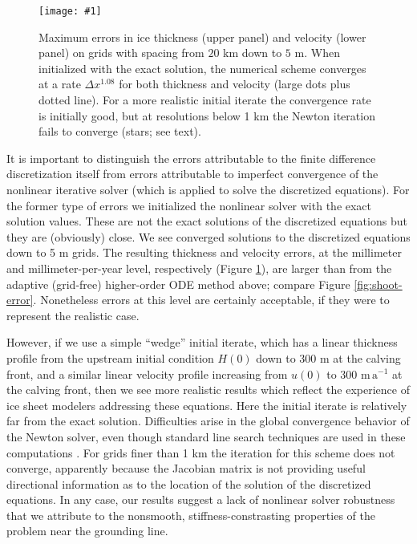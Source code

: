 \documentclass[review,letterpaper]{igs}
\newcommand{\onecol}[1]{\texttt{[image: \#1]}}
\begin{document}
\begin{figure}[ht]
\onecol{convmarine}
\caption{Maximum errors in ice thickness (upper panel) and velocity (lower panel) on grids with spacing from $20$ km down to $5$ m.  When initialized with the exact solution, the numerical scheme converges at a rate $\Delta x^{1.08}$ for both thickness and velocity (large dots plus dotted line).  For a more realistic initial iterate the convergence rate is initially good, but at resolutions below 1 km the Newton iteration fails to converge (stars; see text).} \label{fig:convmarine}
\end{figure}

It is important to distinguish the errors attributable to the finite difference discretization itself from errors attributable to imperfect convergence of the nonlinear iterative solver (which is applied to solve the discretized equations).  For the former type of errors we initialized the nonlinear solver with the exact solution values.  These are not the exact solutions of the discretized equations but they are (obviously) close.  We see converged solutions to the discretized equations down to 5 m grids.  The resulting thickness and velocity errors, at the millimeter and millimeter-per-year level, respectively (Figure \ref{fig:convmarine}), are larger than from the adaptive (grid-free) higher-order ODE method above; compare Figure \ref{fig:shoot-error}.  Nonetheless errors at this level are certainly acceptable, if they were to represent the realistic case.

However, if we use a simple ``wedge'' initial iterate, which has a linear thickness profile from the upstream initial condition $H(0)$ down to 300 m at the calving front, and a similar linear velocity profile increasing from $u(0)$ to 300 $\text{m}\,\text{a}^{-1}$ at the calving front, then we see more realistic results which reflect the experience of ice sheet modelers addressing these equations.  Here the initial iterate is relatively far from the exact solution.  Difficulties arise in the global convergence behavior of the Newton solver, even though standard line search techniques are used in these computations \citep{Kelley,petsc-user-ref}.  For grids finer than 1 km the iteration for this scheme does not converge, apparently because the Jacobian matrix is not providing useful directional information as to the location of the solution of the discretized equations.  In any case, our results suggest a lack of nonlinear solver robustness that we attribute to the nonsmooth, stiffness-constrasting properties of the problem near the grounding line.
\end{document}
